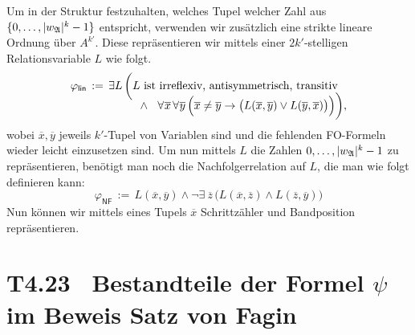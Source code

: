 \documentclass[fontsize=11pt, twoside=false, numbers=autoenddot]{scrbook}
\begin{document}
Um in der Struktur festzuhalten, welches Tupel welcher Zahl aus $\{0,\dots,|w_\mathfrak{A}|^k-1\}$
entspricht,
verwenden wir zusätzlich eine strikte lineare Ordnung über $A^{k'}$.
Diese repräsentieren wir mittels einer $2k'$-stelligen Relationsvariable $L$ wie folgt.
%
\begin{align*}
  \varphi_{\textsf{lin}} & \,:=\, \exists L\,\bigg(L \text{~ist irreflexiv, antisymmetrisch, transitiv} \\[-.7\baselineskip]
                         & \hspace*{16mm} \land~~ \forall\:\!\overline{x}\,\forall\:\!\overline{y}\,
                                          \Big(\overline{x} \neq \overline{y} \to \big(L(\overline{x},\overline{y}) \lor L(\overline{y},\overline{x})\big)\Big)\bigg),
\end{align*}
%
wobei $\overline{x},\overline{y}$ jeweils $k'$-Tupel von Variablen sind
und die fehlenden FO-Formeln wieder leicht einzusetzen sind.
Um nun mittels $L$ die Zahlen $0,\dots,|w_\mathfrak{A}|^k-1$ zu repräsentieren,
benötigt man noch die Nachfolgerrelation auf $L$, die man wie folgt definieren kann:
%
\[
  \varphi_{\textsf{NF}} \,:=\, L(\overline{x},\overline{y}) \land \lnot \exists\:\!\overline{z}\,\big(L(\overline{x},\overline{z}) \land L(\overline{z},\overline{y})\big)
\]
%
Nun können wir mittels eines Tupels $\overline{x}$ Schrittzähler und Bandposition repräsentieren.

\goodbreak
\section*{T4.23~ Bestandteile der Formel {\boldmath $\psi$} im Beweis Satz von Fagin}
\end{document}
